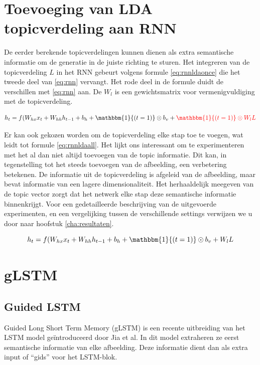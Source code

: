 \section{Toevoeging van LDA topicverdeling aan RNN}
De eerder berekende topicverdelingen kunnen dienen als extra semantische informatie om de generatie in de juiste richting te sturen. Het integreren van de topicverdeling $L$ in het RNN gebeurt volgens formule \eqref{eq:rnnldaonce} die het tweede deel van \eqref{eq:rnn} vervangt. Het rode deel in de formule duidt de verschillen met \eqref{eq:rnn} aan. De $W_l$ is een gewichtsmatrix voor vermenigvuldiging met de topicverdeling.

\begin{equation}
    h_t = f(W_{hx} x_{t} + W_{hh} h_{t-1} + b_h + \mathbbm{1}{(t=1)} \odot b_v +\color{red}{\mathbbm{1}{(t=1)} \odot W_lL}
    \color{black}
    \label{eq:rnnldaonce}
\end{equation}

Er kan ook gekozen worden om de topicverdeling elke stap toe te voegen, wat leidt tot formule \eqref{eq:rnnldaall}. Het lijkt ons interessant om te experimenteren met het al dan niet altijd toevoegen van de topic informatie. Dit kan, in tegenstelling tot het steeds toevoegen van de afbeelding, een verbetering betekenen. De informatie uit de topicverdeling is afgeleid van de afbeelding, maar bevat informatie van een lagere dimensionaliteit. Het herhaaldelijk meegeven van de topic vector zorgt dat het netwerk elke stap deze semantische informatie binnenkrijgt. Voor een gedetailleerde beschrijving van de uitgevoerde experimenten, en een vergelijking tussen de verschillende settings verwijzen we u door naar hoofstuk \ref{cha:resultaten}.


\begin{equation}
    h_t = f(W_{hx} x_{t} + W_{hh} h_{t-1} + b_h + \mathbbm{1}{(t=1)} \odot b_v + W_lL
    \label{eq:rnnldaall}
\end{equation}


\section{gLSTM}
\subsection{Guided LSTM}
Guided Long Short Term Memory (gLSTM) is een recente uitbreiding van het LSTM model ge\"introduceerd door Jia et al.\cite{Fernando2015} In dit model extraheren ze eerst semantische informatie van elke afbeelding. Deze informatie dient dan als extra input of ``gids'' voor het LSTM-blok.

